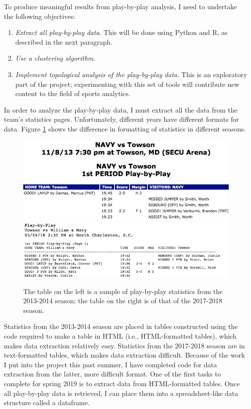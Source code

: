 \documentclass[12pt, letterpaper]{article}
\begin{document}
To produce meaningful results from play-by-play analysis, I need to undertake the following objectives:

\begin{enumerate}
\item \textit{Extract all play-by-play data}. This will be done using Python and R, as described in the next paragraph.
\item \textit{Use a clustering algorithm}.
\item \textit{Implement topological analysis of the play-by-play data}. This is an exploratory part of the project; experimenting with this set of tools will contribute new content to the field of sports analytics.
\end{enumerate}

In order to analyze the play-by-play data, I must extract all the data from the team’s statistics pages. Unfortunately, different years have different formats for data. Figure \ref{f: pbp} shows the difference in formatting of statistics in different seasons. 

\begin{figure}[h]
\begin{center}
\includegraphics[height = 0.9 in]{pbp_2013.png}
\includegraphics[height = 0.9 in]{pbp_2017.png}
\caption{The table on the left is a sample of play-by-play statistics from the 2013-2014 season; the table on the right is of that of the 2017-2018 season.}
\label{f: pbp}
\end{center}
\end{figure}
\vspace{-23pt}
Statistics from the 2013-2014 season are placed in tables constructed using the code required to make a table in HTML (i.e., HTML-formatted tables), which makes data extraction relatively easy. Statistics from the 2017-2018 season are in text-formatted tables, which makes data extraction difficult. Because of the work I put into the project this past summer, I have completed code for data extraction from the latter, more difficult format. One of the first tasks to complete for spring 2019 is to extract data from HTML-formatted tables. Once all play-by-play data is retrieved, I can place them into a spreadsheet-like data structure called a dataframe. 
\end{document}
